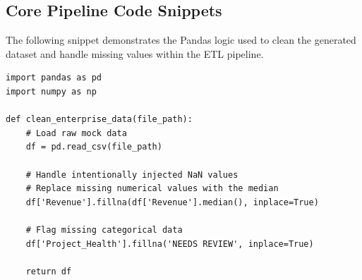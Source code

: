 \documentclass{book}
\begin{document}




\begin{appendices}
\chapter{Core Pipeline Code Snippets}
The following snippet demonstrates the Pandas logic used to clean the generated dataset and handle missing values within the ETL pipeline.

\begin{verbatim}
import pandas as pd
import numpy as np

def clean_enterprise_data(file_path):
    # Load raw mock data
    df = pd.read_csv(file_path)
    
    # Handle intentionally injected NaN values
    # Replace missing numerical values with the median
    df['Revenue'].fillna(df['Revenue'].median(), inplace=True)
    
    # Flag missing categorical data
    df['Project_Health'].fillna('NEEDS REVIEW', inplace=True)
    
    return df
\end{verbatim}

\end{appendices}
\end{document}

